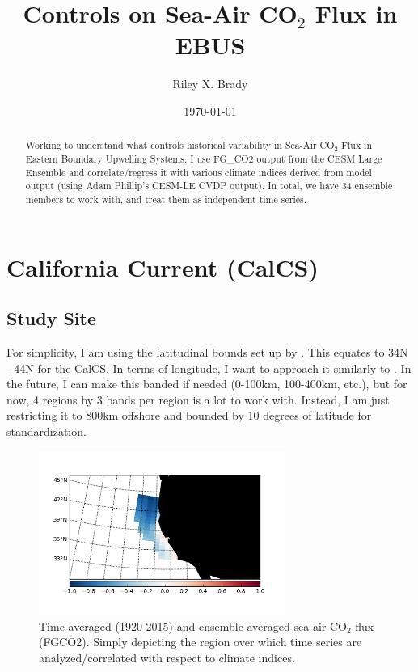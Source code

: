 \documentclass[12pt]{article}
\title{Controls on Sea-Air CO$_{2}$ Flux in EBUS}
\author{Riley X. Brady}
\date{\today}
\begin{document}
\maketitle
\begin{abstract}
\noindent Working to understand what controls historical variability in Sea-Air CO$_{2}$ Flux in Eastern Boundary Upwelling Systems. I use FG\_CO2 output from the CESM Large Ensemble and correlate/regress it with various climate indices derived from model output (using Adam Phillip's CESM-LE CVDP output). In total, we have 34 ensemble members to work with, and treat them as independent time series.
\end{abstract}

\section{California Current (CalCS)}
\subsection{Study Site}
For simplicity, I am using the latitudinal bounds set up by \citet{Chavez:2009}. This equates to 34N - 44N for the CalCS. In terms of longitude, I want to approach it similarly to \citet{Turi:2014}. In the future, I can make this banded if needed (0-100km, 100-400km, etc.), but for now, 4 regions by 3 bands per region is a lot to work with. Instead, I am just restricting it to 800km offshore and bounded by 10 degrees of latitude for standardization.
\begin{figure}[!h]
	\centering
	\includegraphics[width=19pc]{../../figs/calcs/study-site/calcs-study-site.png}
	\caption{Time-averaged (1920-2015) and ensemble-averaged sea-air CO$_{2}$ flux (FGCO2). Simply depicting the region over which time series are analyzed/correlated with respect to climate indices.}
	\label{fig:1}
\end{figure}
\end{document}
